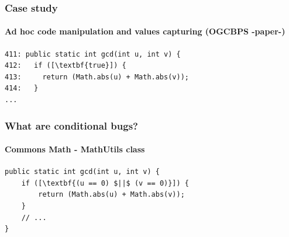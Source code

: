 \documentclass{beamer}
\begin{document}
 \begin{frame}[fragile]
    \frametitle{Case study}
      \framesubtitle{Ad hoc code manipulation and values capturing (OGCBPS -paper-)}
\begin{lstlisting}[escapeinside=\[\]]
411: public static int gcd(int u, int v) {
412:   if ([\textbf{true}]) {
413:     return (Math.abs(u) + Math.abs(v));
414:   }
...
\end{lstlisting}
\end{frame}

 \begin{frame}[fragile]
    \frametitle{What are conditional bugs?}
    \framesubtitle{Commons Math - MathUtils class}
        \begin{lstlisting}[escapeinside=\[\]]
public static int gcd(int u, int v) {
    if ([\textbf{(u == 0) $||$ (v == 0)}]) {
        return (Math.abs(u) + Math.abs(v));
    }
    // ...
}
	\end{lstlisting}
\end{frame}
\end{document}
